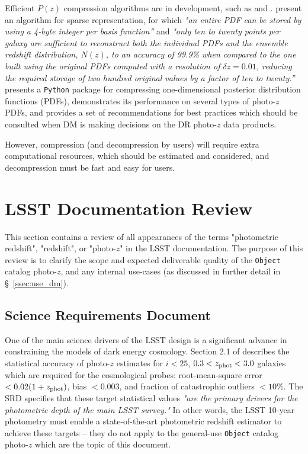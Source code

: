 \documentclass[DM,lsstdraft,toc]{lsstdoc}
\begin{document}
Efficient $P(z)$ compression algorithms are in development, such as \citet{2014MNRAS.441.3550C} and \citet{2018AJ....156...35M}.
\citet{2014MNRAS.441.3550C} present an algorithm for sparse representation, for which {\it "an entire PDF can be stored by using a 4-byte integer per basis function''} and {\it "only ten to twenty points per galaxy are sufficient to reconstruct both the individual PDFs and the ensemble redshift distribution, $N(z)$, to an accuracy of 99.9\% when compared to the one built using the original PDFs computed with a resolution of $\delta z = 0.01$, reducing the required storage of two hundred original values by a factor of ten to twenty.''} 
\citet{2018AJ....156...35M} presents a {\tt Python} package for compressing one-dimensional posterior distribution functions (PDFs), demonstrates its performance on several types of photo-$z$ PDFs, and provides a set of recommendations for best practices which should be consulted when DM is making decisions on the DR photo-$z$ data products.

However, compression (and decompression by users) will require extra computational resources, which should be estimated and considered, and decompression must be fast and easy for users.


\clearpage
\section{LSST Documentation Review}\label{sec:docs}

This section contains a review of all appearances of the terms "photometric redshift", "redshift", or "photo-$z$" in the LSST documentation.
The purpose of this review is to clarify the scope and expected deliverable quality of the {\tt Object} catalog photo-$z$, and any internal use-cases (as discussed in further detail in \S~\ref{ssec:use_dm}).

\subsection{Science Requirements Document}\label{ssec:docs_srd}

One of the main science drivers of the LSST design is a significant advance in constraining the models of dark energy cosmology. 
Section 2.1 of  describes the statistical accuracy of photo-$z$ estimates for $i<25$, $0.3<z_{\rm phot}<3.0$ galaxies which are required for the cosmological probes: root-mean-square error $<0.02(1+z_{\rm phot})$, bias $<0.003$, and fraction of catastrophic outliers $<10\%$.
The SRD specifies that these target statistical values {\it "are the primary drivers for the photometric depth of the main LSST survey."} 
In other words, the LSST 10-year photometry must enable a state-of-the-art photometric redshift estimator to achieve these targets -- they do not apply to the general-use {\tt Object} catalog photo-$z$ which are the topic of this document.
\end{document}
